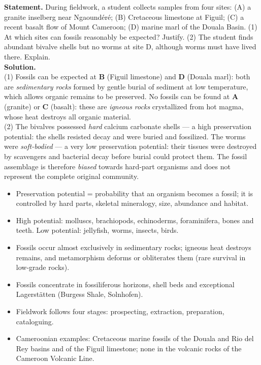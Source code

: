 \documentclass[11pt]{article}
\newcommand{\cle}[1]{{\popxbold\color{popdark}#1}}
\begin{document}
\begin{exoresolu}
\textbf{Statement.} During fieldwork, a student collects samples from four sites: (A) a granite inselberg near Ngaoundéré; (B) Cretaceous limestone at Figuil; (C) a recent basalt flow of Mount Cameroon; (D) marine marl of the Douala Basin. (1) At which sites can fossils reasonably be expected? Justify. (2) The student finds abundant bivalve shells but no worms at site D, although worms must have lived there. Explain.\\
\tcblower
\textbf{Solution.}\\
(1) Fossils can be expected at \textbf{B} (Figuil limestone) and \textbf{D} (Douala marl): both are \emph{sedimentary rocks} formed by gentle burial of sediment at low temperature, which allows organic remains to be preserved. No fossils can be found at \textbf{A} (granite) or \textbf{C} (basalt): these are \emph{igneous rocks} crystallized from hot magma, whose heat destroys all organic material.\\
(2) The bivalves possessed \emph{hard} calcium carbonate shells --- a high preservation potential: the shells resisted decay and were buried and fossilized. The worms were \emph{soft-bodied} --- a very low preservation potential: their tissues were destroyed by scavengers and bacterial decay before burial could protect them. The fossil assemblage is therefore \emph{biased} towards hard-part organisms and does not represent the complete original community.
\end{exoresolu}

\begin{aretenir}
\begin{itemize}
\item \cle{Preservation potential} = probability that an organism becomes a fossil; it is controlled by hard parts, skeletal mineralogy, size, abundance and habitat.
\item High potential: molluscs, brachiopods, echinoderms, foraminifera, bones and teeth. Low potential: jellyfish, worms, insects, birds.
\item Fossils occur almost exclusively in \cle{sedimentary rocks}; igneous heat destroys remains, and metamorphism deforms or obliterates them (rare survival in low-grade rocks).
\item Fossils concentrate in fossiliferous horizons, shell beds and exceptional \cle{Lagerstätten} (Burgess Shale, Solnhofen).
\item Fieldwork follows four stages: prospecting, extraction, preparation, cataloguing.
\item Cameroonian examples: Cretaceous marine fossils of the Douala and Rio del Rey basins and of the Figuil limestone; none in the volcanic rocks of the Cameroon Volcanic Line.
\end{itemize}
\end{aretenir}
\end{document}
